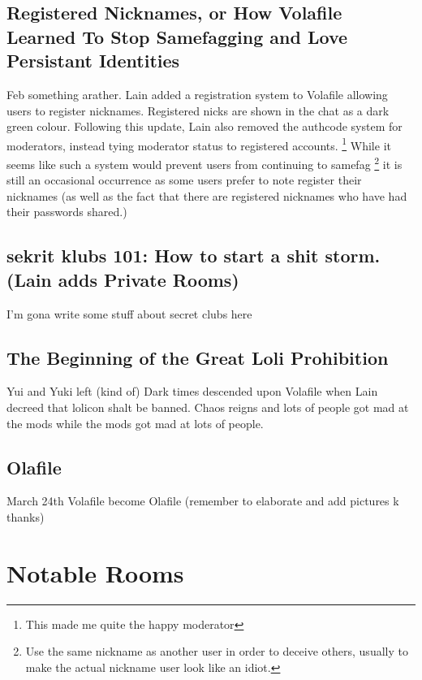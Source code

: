 \documentclass[12pt]{report}
\begin{document}
{\vfill
\pagebreak

\section[Registered Nicknames]{Registered Nicknames, or How Volafile Learned To Stop Samefagging and Love Persistant Identities\footnotemark}
Feb something arather. Lain added a registration system to Volafile allowing users to register nicknames. Registered nicks are shown in the chat as a dark green colour. Following this update, Lain also removed the authcode system for moderators, instead tying moderator status to registered accounts.
	\footnote{This made me quite the happy moderator} While it seems like such a system would prevent users from continuing to samefag
	\footnote{Use the same nickname as another user in order to deceive others, usually to make the actual nickname user look like an idiot.}
 it is still an occasional occurrence as some users prefer to note register their nicknames (as well as the fact that there are registered nicknames who have had their passwords shared.)

\section[sekrit klubs 101]{sekrit klubs 101: How to start a shit storm. (Lain adds Private Rooms)}
	I'm gona write some stuff about secret clubs here 

\section{The Beginning of the Great Loli Prohibition}
Yui and Yuki left (kind of) Dark times descended upon Volafile when Lain
decreed that lolicon shalt be banned. Chaos reigns and lots of people got
mad at the mods while the mods got mad at lots of people.
\vfill
\pagebreak



\section{Olafile}
March 24th Volafile become Olafile (remember to elaborate and add pictures k thanks)

\chapter{Notable Rooms}

}
\end{document}
